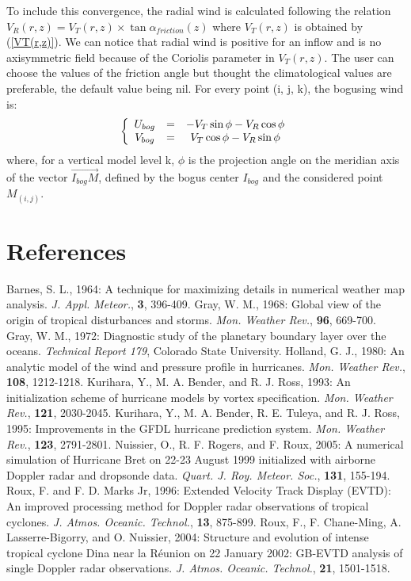 To include this convergence, the radial wind is calculated following the relation $V_{R}(r,z)=V_{T}(r,z) \times \tan \alpha_{friction}(z)$ where $V_{T}(r,z)$ is obtained by (\ref{VT(r,z)}). We can notice that radial wind is positive for an inflow and is no axisymmetric field because of the Coriolis parameter in $V_{T}(r,z)$. The user can choose the values of the friction angle but thought the climatological values are preferable, the default value being nil. For every point (i, j, k), the bogusing wind is:
\begin{equation}
\left \lbrace
\begin{array}{c c c}
U_{bog} &=& - V_{T} \sin \phi - V_{R} \cos \phi\\
V_{bog} &=& V_{T} \cos \phi - V_{R} \sin \phi\\
\end{array}
\right .
\end{equation}
where, for a vertical model level k, $\phi$ is the projection angle on the meridian axis of the vector $\overrightarrow{I_{bog}M}$, defined by the bogus center $I_{bog}$ and the considered point $M_{(i,j)}$.

\section{References}
\noindent
\por
Barnes, S. L., 1964:
A technique for maximizing details in numerical weather map analysis. {\it J. Appl. Meteor.}, {\bf 3}, 396-409.
\por
Gray, W. M., 1968:
Global view of the origin of tropical disturbances and storms. {\it Mon. Weather Rev.}, {\bf 96}, 669-700.
\por
Gray, W. M., 1972:
Diagnostic study of the planetary boundary layer over the oceans. {\it Technical Report 179}, Colorado State University.
\por
Holland, G. J., 1980:
An analytic model of the wind and pressure profile in hurricanes.
{\it Mon. Weather Rev.}, {\bf 108}, 1212-1218.
\por 
Kurihara, Y., M. A. Bender, and R. J. Ross, 1993:
An initialization scheme of hurricane models by vortex specification.
{\it Mon. Weather Rev.}, {\bf 121}, 2030-2045.
\por
Kurihara, Y., M. A. Bender, R. E. Tuleya, and R. J. Ross, 1995:
Improvements in the GFDL hurricane prediction system.
{\it Mon. Weather Rev.}, {\bf 123}, 2791-2801.
\por 
Nuissier, O., R. F. Rogers, and F. Roux, 2005:
A numerical simulation of Hurricane Bret on 22-23 August 1999
initialized with airborne Doppler radar and dropsonde data.
{\it Quart. J. Roy. Meteor. Soc.}, {\bf 131}, 155-194.
\por
Roux, F. and F. D. Marks Jr, 1996:
Extended Velocity Track Display (EVTD): An improved processing method for 
Doppler radar observations of tropical cyclones.
{\it J. Atmos. Oceanic. Technol.}, {\bf 13}, 875-899.
\por
Roux, F., F. Chane-Ming, A. Lasserre-Bigorry, and O. Nuissier, 2004:
Structure and evolution of intense tropical cyclone Dina near la R\'eunion on 22 
January 2002: GB-EVTD analysis of single Doppler radar observations.
{\it J. Atmos. Oceanic. Technol.}, {\bf 21}, 1501-1518.



